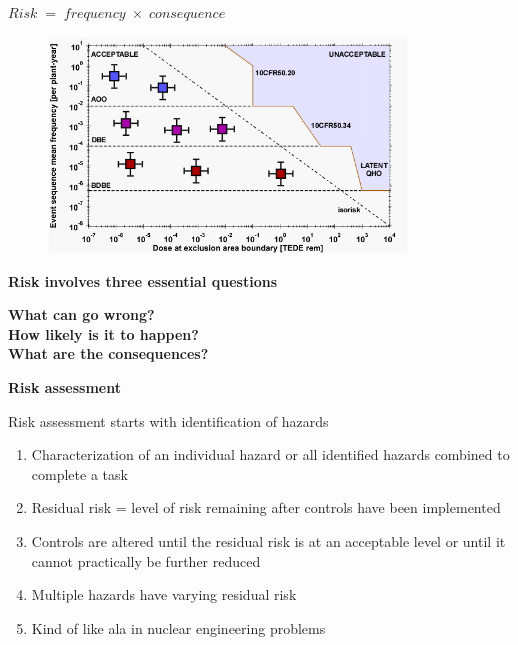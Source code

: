 \documentclass[aspectratio=1610,pdftex,dvipsnames,compress,xcolor={dvipsnames}]{beamer}
\newcommand{\acs}{\acrshort} %
\begin{document}
\begin{frame}{$Risk \; = \; frequency \; \times \; consequence$}
    \begin{figure}
        \centering
        \includegraphics[width=0.85\textwidth]{farmer.jpg}
    \end{figure}
\end{frame}


\begin{frame}[plain]{}
    \centering\LARGE\textbf{Risk involves three essential questions}
\end{frame}


\begin{frame}[plain]{}
    \centering\LARGE\textbf{What can go wrong?}\\
    \centering\LARGE\textbf{How likely is it to happen?}\\
    \centering\LARGE\textbf{What are the consequences?}
\end{frame}


\begin{frame}[plain]{}
    \centering\LARGE\textbf{Risk assessment}
\end{frame}


\addtocounter{framenumber}{-3}
\begin{frame}{Risk assessment starts with identification of hazards}
    \begin{enumerate}[series=outerlist,topsep=0pt,itemsep=18pt,leftmargin=*,label=(\arabic*)]
        \item[]Characterization of an individual hazard or all identified hazards combined to complete a task
        \item[]Residual risk = level of risk remaining after controls have been implemented
        \item[]Controls are altered until the residual risk is at an acceptable level or until it cannot practically be further reduced
        \item[]Multiple hazards have varying residual risk
        \item[]Kind of like \acs{ala} in nuclear engineering problems
    \end{enumerate}
\end{frame}
\end{document}
